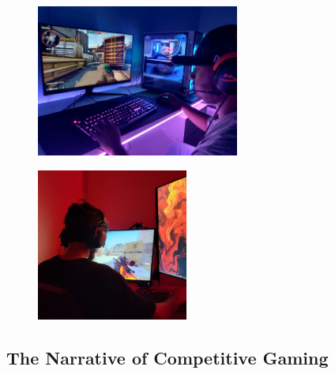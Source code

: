 \documentclass[manuscript,screen,review,anonymous]{acmart}
\begin{document}
\begin{figure}[h]
\centering
\begin{minipage}{.5\textwidth}
  \centering
  \includegraphics[width=0.9\linewidth,height=5cm]{IMG_20230710_232735}
  \label{fig:aspiring}
\end{minipage}%
\begin{minipage}{.5\textwidth}
  \centering
  \includegraphics[width=0.9\linewidth,height=5cm]{IMG_20230710_232535}
  \label{fig:Professional}
\end{minipage}%
\end{figure}

\subsection{The Narrative of Competitive Gaming}

\end{document}
